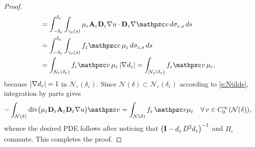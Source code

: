 \begin{proof}
\begin{align*}
& =
\int_{-{\delta_\varepsilon}}^{{\delta_\varepsilon}}\int_{\gamma_\varepsilon(s)}
\mue \bAe \bDe \nabla u \cdot \bDe \nabla \tv \, d\sigma_{\varepsilon,s} \, ds
\\
& = \int_{-{\delta_\varepsilon}}^{{\delta_\varepsilon}}\int_{\gamma_\varepsilon(s)}
\fe \tv \, \mue \, d\sigma_{\varepsilon,s} \, ds
\\
& = \int_{{\mathcal{N}}_\varepsilon({\delta_\varepsilon})} \fe \tv \, \mue \, |\nabla\wde|
= \int_{{\mathcal{N}}_\varepsilon({\delta_\varepsilon})} \fe \tv \, \mue,
\end{align*}
%
because $|\nabla d_\varepsilon|=1$ in ${\mathcal{N}}_\varepsilon({\delta_\varepsilon})$.
Since ${\mathcal N(\delta)}\subset {\mathcal{N}}_\varepsilon({\delta_\varepsilon})$ according to \eqref{e:Ntilde}, integration by parts gives
%
\[
- \int_{\mathcal N(\delta)} \mathrm{div} \big(\mue \bDe \bAe \bDe \nabla u \big) \tv =
\int_{\mathcal N(\delta)} \fe \, \tv \mue
\quad\forall \, v\in C_0^\infty({\mathcal N(\delta)}),
\]
%
whence the desired PDE follows after noticing that
$\big({\bf I} - d_\varepsilon \, D^2d_\varepsilon \big)^{-1}$ and  $\Pi_\varepsilon$ commute.
This completes the proof.
\end{proof}










